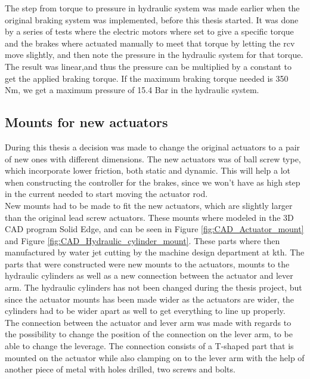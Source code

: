 \documentclass[a4paper,11pt]{kth-mag}
\begin{document}
The step from torque to pressure in hydraulic system was made earlier when the original braking system was implemented, before this thesis started. It was done by a series of tests where the electric motors where set to give a specific torque and the brakes where actuated manually to meet that torque by letting the \gls{rcv} move slightly, and then note the pressure in the hydraulic system for that torque. The result was linear,and thus the pressure can be multiplied by a constant to get the applied braking torque. If the maximum braking torque needed is 350 Nm, we get a maximum pressure of 15.4 Bar in the hydraulic system.


\subsection{Mounts for new actuators}

During this thesis a decision was made to change the original actuators to a pair of new ones with different dimensions. The new actuators was of ball screw type, which incorporate lower friction, both static and dynamic. This will help a lot when constructing the controller for the brakes, since we won't have as high step in the current needed to start moving the actuator rod. \\

New mounts had to be made to fit the new actuators, which are slightly larger than the original lead screw actuators. These mounts where modeled in the 3D CAD program Solid Edge, and can be seen in Figure \ref{fig:CAD_Actuator_mount} and Figure \ref{fig:CAD_Hydraulic_cylinder_mount}. These parts where then manufactured by water jet cutting by the machine design department at \gls{kth}. The parts that were constructed were new mounts to the actuators, mounts to the hydraulic cylinders as well as a new connection between the actuator and lever arm. The hydraulic cylinders has not been changed during the thesis project, but since the actuator mounts has been made wider as the actuators are wider, the cylinders had to be wider apart as well to get everything to line up properly. \\

The connection between the actuator and lever arm was made with regards to the possibility to change the position of the connection on the lever arm, to be able to change the leverage. The connection consists of a T-shaped part that is mounted on the actuator while also clamping on to the lever arm with the help of another piece of metal with holes drilled, two screws and bolts. \\
\end{document}
